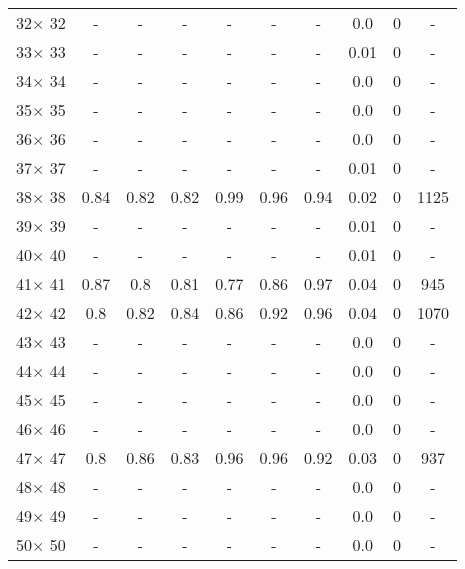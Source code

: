 \documentclass[main.tex]{subfiles}
\begin{document}
\begin{table}
\begin{tabular}{|c||c|c|c|c|c|c||c|c|c|}
32$\times$ 32 & - & - & - & - & - & - &0.0 &0 &-\\
33$\times$ 33 & - & - & - & - & - & - &0.01 &0 &-\\
34$\times$ 34 & - & - & - & - & - & - &0.0 &0 &-\\
35$\times$ 35 & - & - & - & - & - & - &0.0 &0 &-\\
36$\times$ 36 & - & - & - & - & - & - &0.0 &0 &-\\
37$\times$ 37 & - & - & - & - & - & - &0.01 &0 &-\\
38$\times$ 38 &0.84 &0.82 &0.82 &0.99 &0.96 &0.94 &0.02 &0 &1125\\
39$\times$ 39 & - & - & - & - & - & - &0.01 &0 &-\\
40$\times$ 40 & - & - & - & - & - & - &0.01 &0 &-\\
41$\times$ 41 &0.87 &0.8 &0.81 &0.77 &0.86 &0.97 &0.04 &0 &945\\
42$\times$ 42 &0.8 &0.82 &0.84 &0.86 &0.92 &0.96 &0.04 &0 &1070\\
43$\times$ 43 & - & - & - & - & - & - &0.0 &0 &-\\
44$\times$ 44 & - & - & - & - & - & - &0.0 &0 &-\\
45$\times$ 45 & - & - & - & - & - & - &0.0 &0 &-\\
46$\times$ 46 & - & - & - & - & - & - &0.0 &0 &-\\
47$\times$ 47 &0.8 &0.86 &0.83 &0.96 &0.96 &0.92 &0.03 &0 &937\\
48$\times$ 48 & - & - & - & - & - & - &0.0 &0 &-\\
49$\times$ 49 & - & - & - & - & - & - &0.0 &0 &-\\
50$\times$ 50 & - & - & - & - & - & - &0.0 &0 &-\\
\hline
\end{tabular}
\end{table}
\end{document}
